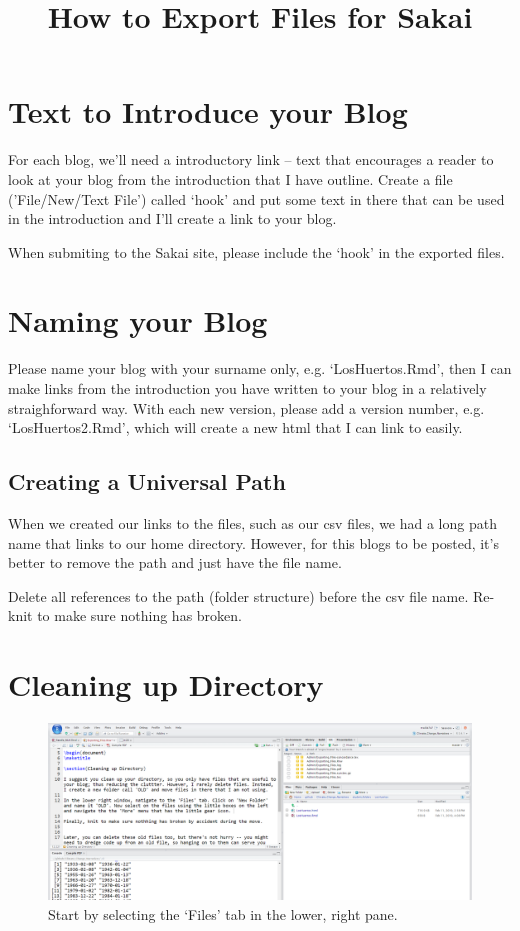 \documentclass{article}\usepackage[]{graphicx}\usepackage[]{color}
\title{How to Export Files for Sakai}
\begin{document}
\maketitle

\section{Text to Introduce your Blog}

For each blog, we'll need a introductory link -- text that encourages a reader to look at your blog from the introduction that I have outline. Create a file ('File/New/Text File') called `hook' and put some text in there that can be used in the introduction and I'll create a link to your blog. 

When submiting to the Sakai site, please include the `hook' in the exported files.  

\section{Naming your Blog}

Please name your blog with your surname only, e.g. `LosHuertos.Rmd', then I can make links from the introduction you have written to your blog in a relatively straighforward way. With each new version, please add a version number, e.g. `LosHuertos2.Rmd', which will create a new html that I can link to easily. 

\subsection{Creating a Universal Path}

When we created our links to the files, such as our csv files, we had a long path name that links to our home directory. However, for this blogs to be posted, it's better to remove the path and just have the file name. 

Delete all references to the path (folder structure) before the csv file name. Re-knit to make sure nothing has broken. 

\section{Cleaning up Directory}

\begin{figure}
\includegraphics[width=\textwidth]{FourWindows}
\caption{Start by selecting the `Files' tab in the lower, right pane.}
\end{figure}
\end{document}
